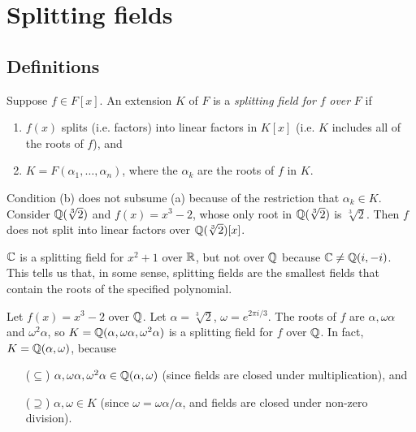 \chapter{Splitting fields}

\section{Definitions}

\begin{definition}
    Suppose $f \in F[x]$. An extension $K$ of $F$ is a \emph{splitting field for} $f$ \emph{over} $F$ if
    \begin{enumerate}[label=(\alph*)]
        \item $f(x)$ splits (i.e. factors) into linear factors in $K[x]$ (i.e. $K$ includes all of the roots of $f$), and
        \item $K = F(\alpha_1, \ldots, \alpha_n)$, where the $\alpha_k$ are the roots of $f$ in $K$.
    \end{enumerate}
\end{definition}

\begin{remark}
    Condition (b) does not subsume (a) because of the restriction that $\alpha_k \in K$. Consider $\mathbb{{Q}}(\sqrt[3]{2})$ and $f(x) = x^3 - 2$, whose only root in $\mathbb{{Q}}(\sqrt[3]{2})$ is $\sqrt[3]{2}$. Then $f$ does not split into linear factors over $\mathbb{{Q(\sqrt[3]{2})}}[x]$.
\end{remark}

\begin{example}
    $\mathbb{{C}}$ is a splitting field for $x^2 + 1$ over $\mathbb{{R}}$, but not over $\mathbb{{Q}}$ because $\mathbb{{C}} \neq \mathbb{{Q}}(i, -i)$. This tells us that, in some sense, splitting fields are the smallest fields that contain the roots of the specified polynomial.
\end{example}

\begin{example}
\label{exmp_spl_field_of_cbrt_2}
    Let $f(x) = x^3 - 2$ over $\mathbb{{Q}}$. Let $\alpha = \sqrt[3]{2}$, $\omega = e^{2\pi i/3}$. The roots of $f$ are $\alpha, \omega \alpha$ and $\omega^2 \alpha$, so $K = \mathbb{{Q}}(\alpha, \omega \alpha, \omega^2 \alpha)$ is a splitting field for $f$ over $\mathbb{{Q}}$. In fact, $K = \mathbb{{Q}}(\alpha, \omega)$, because
    \begin{itemize}
        \item[($\subseteq$)] $\alpha, \omega \alpha, \omega^2 \alpha \in \mathbb{{Q}}(\alpha, \omega)$ (since fields are closed under multiplication), and
        \item[($\supseteq$)] $\alpha, \omega \in K$ (since $\omega = \omega \alpha / \alpha$, and fields are closed under non-zero division).
    \end{itemize}
\end{example}

